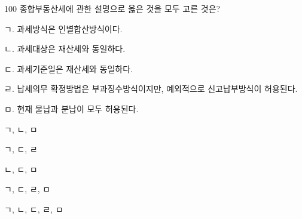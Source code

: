 \begin{question}{100}
종합부동산세에 관한 설명으로 옳은 것을 모두 고른 것은?
\begin{framedtext}
ㄱ. 과세방식은 인별합산방식이다. \par
ㄴ. 과세대상은 재산세와 동일하다. \par
ㄷ. 과세기준일은 재산세와 동일하다. \par
ㄹ. 납세의무 확정방법은 부과징수방식이지만, 예외적으로 신고납부방식이 허용된다. \par
ㅁ. 현재 물납과 분납이 모두 허용된다. \par
\end{framedtext}
\begin{choices}
  \item ㄱ, ㄴ, ㅁ
  \item ㄱ, ㄷ, ㄹ
  \item ㄴ, ㄷ, ㅁ
  \item ㄱ, ㄷ, ㄹ, ㅁ
  \item ㄱ, ㄴ, ㄷ, ㄹ, ㅁ
\end{choices}
\end{question}
